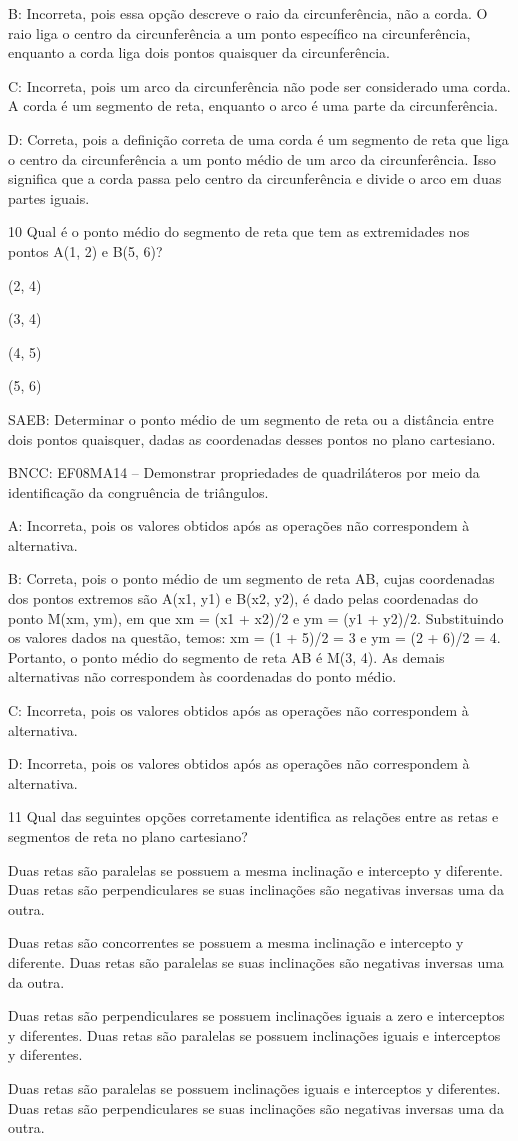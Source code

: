 {B: Incorreta, pois essa opção descreve o raio da circunferência, não a
corda. O raio liga o centro da circunferência a um ponto específico na
circunferência, enquanto a corda liga dois pontos quaisquer da
circunferência.

C: Incorreta, pois um arco da circunferência não pode ser considerado
uma corda. A corda é um segmento de reta, enquanto o arco é uma parte da
circunferência.

D: Correta, pois a definição correta de uma corda é um segmento de reta
que liga o centro da circunferência a um ponto médio de um arco da
circunferência. Isso significa que a corda passa pelo centro da
circunferência e divide o arco em duas partes iguais.

\num{10} Qual é o ponto médio do segmento de reta que tem as extremidades nos
pontos A(1, 2) e B(5, 6)?
\item (2, 4)
\item (3, 4)
\item (4, 5)
\item (5, 6)

SAEB: Determinar o ponto médio de um segmento de reta ou a distância
entre dois pontos quaisquer, dadas as coordenadas desses pontos no plano
cartesiano.

BNCC: EF08MA14 -- Demonstrar propriedades de quadriláteros por meio da
identificação da congruência de triângulos.

A: Incorreta, pois os valores obtidos após as operações não correspondem
à alternativa.

B: Correta, pois o ponto médio de um segmento de reta AB, cujas
coordenadas dos pontos extremos são A(x1, y1) e B(x2, y2), é dado pelas
coordenadas do ponto M(xm, ym), em que xm = (x1 + x2)/2 e ym = (y1 +
y2)/2. Substituindo os valores dados na questão, temos: xm = (1 + 5)/2 =
3 e ym = (2 + 6)/2 = 4. Portanto, o ponto médio do segmento de reta AB é
M(3, 4). As demais alternativas não correspondem às coordenadas do ponto
médio.

C: Incorreta, pois os valores obtidos após as operações não correspondem
à alternativa.

D: Incorreta, pois os valores obtidos após as operações não correspondem
à alternativa.

\num{11} Qual das seguintes opções corretamente identifica as relações entre
as retas e segmentos de reta no plano cartesiano?
\item Duas retas são paralelas se possuem a mesma inclinação e intercepto y
diferente. Duas retas são perpendiculares se suas inclinações são
negativas inversas uma da outra.
\item Duas retas são concorrentes se possuem a mesma inclinação e
intercepto y diferente. Duas retas são paralelas se suas inclinações são
negativas inversas uma da outra.
\item Duas retas são perpendiculares se possuem inclinações iguais a zero e
interceptos y diferentes. Duas retas são paralelas se possuem
inclinações iguais e interceptos y diferentes.
\item Duas retas são paralelas se possuem inclinações iguais e interceptos
y diferentes. Duas retas são perpendiculares se suas inclinações são
negativas inversas uma da outra.

}
